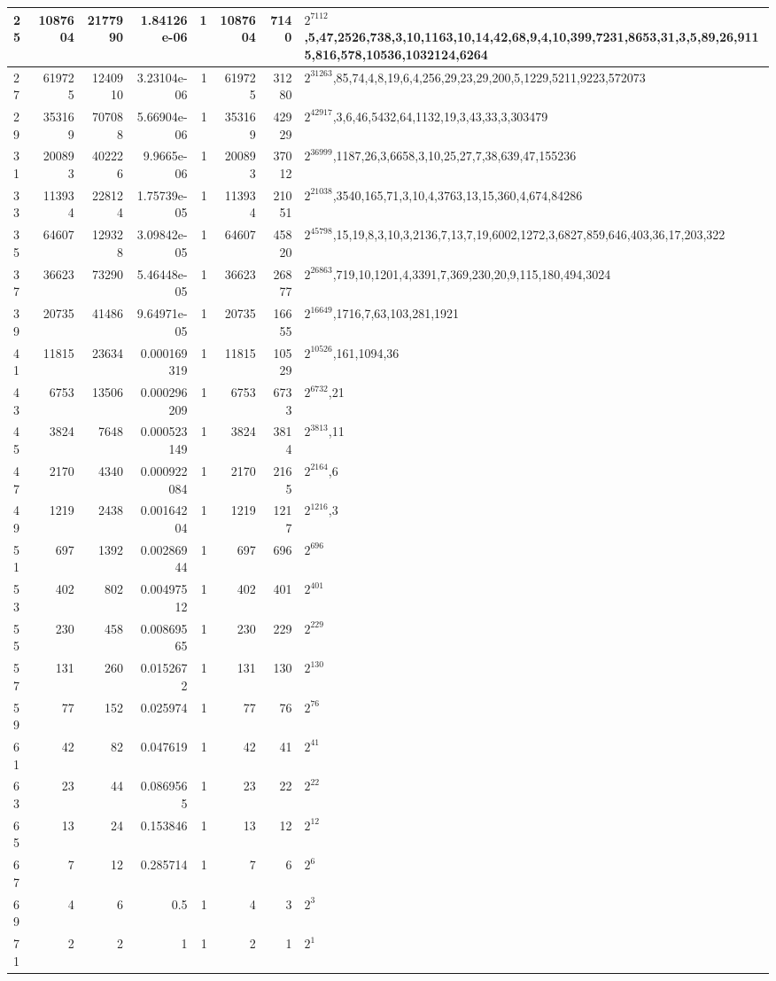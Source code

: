 \documentclass[10pt,a4paper]{standalone}
\begin{document}
\begin{tabular}{l|r|r|r|r|r|r|l|}
25 & 1087604 & 2177990 & 1.84126e-06 & 1 & 1087604 & 7140 & $2^{7112}$,5,47,2526,738,3,10,1163,10,14,42,68,9,4,10,399,7231,8653,31,3,5,89,26,9115,816,578,10536,1032124,6264 \\ \hline
27 & 619725 & 1240910 & 3.23104e-06 & 1 & 619725 & 31280 & $2^{31263}$,85,74,4,8,19,6,4,256,29,23,29,200,5,1229,5211,9223,572073 \\ \hline
29 & 353169 & 707088 & 5.66904e-06 & 1 & 353169 & 42929 & $2^{42917}$,3,6,46,5432,64,1132,19,3,43,33,3,303479 \\ \hline
31 & 200893 & 402226 & 9.9665e-06 & 1 & 200893 & 37012 & $2^{36999}$,1187,26,3,6658,3,10,25,27,7,38,639,47,155236 \\ \hline
33 & 113934 & 228124 & 1.75739e-05 & 1 & 113934 & 21051 & $2^{21038}$,3540,165,71,3,10,4,3763,13,15,360,4,674,84286 \\ \hline
35 & 64607 & 129328 & 3.09842e-05 & 1 & 64607 & 45820 & $2^{45798}$,15,19,8,3,10,3,2136,7,13,7,19,6002,1272,3,6827,859,646,403,36,17,203,322 \\ \hline
37 & 36623 & 73290 & 5.46448e-05 & 1 & 36623 & 26877 & $2^{26863}$,719,10,1201,4,3391,7,369,230,20,9,115,180,494,3024 \\ \hline
39 & 20735 & 41486 & 9.64971e-05 & 1 & 20735 & 16655 & $2^{16649}$,1716,7,63,103,281,1921 \\ \hline
41 & 11815 & 23634 & 0.000169319 & 1 & 11815 & 10529 & $2^{10526}$,161,1094,36 \\ \hline
43 & 6753 & 13506 & 0.000296209 & 1 & 6753 & 6733 & $2^{6732}$,21 \\ \hline
45 & 3824 & 7648 & 0.000523149 & 1 & 3824 & 3814 & $2^{3813}$,11 \\ \hline
47 & 2170 & 4340 & 0.000922084 & 1 & 2170 & 2165 & $2^{2164}$,6 \\ \hline
49 & 1219 & 2438 & 0.00164204 & 1 & 1219 & 1217 & $2^{1216}$,3 \\ \hline
51 & 697 & 1392 & 0.00286944 & 1 & 697 & 696 & $2^{696}$ \\ \hline
53 & 402 & 802 & 0.00497512 & 1 & 402 & 401 & $2^{401}$ \\ \hline
55 & 230 & 458 & 0.00869565 & 1 & 230 & 229 & $2^{229}$ \\ \hline
57 & 131 & 260 & 0.0152672 & 1 & 131 & 130 & $2^{130}$ \\ \hline
59 & 77 & 152 & 0.025974 & 1 & 77 & 76 & $2^{76}$ \\ \hline
61 & 42 & 82 & 0.047619 & 1 & 42 & 41 & $2^{41}$ \\ \hline
63 & 23 & 44 & 0.0869565 & 1 & 23 & 22 & $2^{22}$ \\ \hline
65 & 13 & 24 & 0.153846 & 1 & 13 & 12 & $2^{12}$ \\ \hline
67 & 7 & 12 & 0.285714 & 1 & 7 & 6 & $2^{6}$ \\ \hline
69 & 4 & 6 & 0.5 & 1 & 4 & 3 & $2^{3}$ \\ \hline
71 & 2 & 2 & 1 & 1 & 2 & 1 & $2^{1}$ \\ \hline
\end{tabular}
\end{document}
